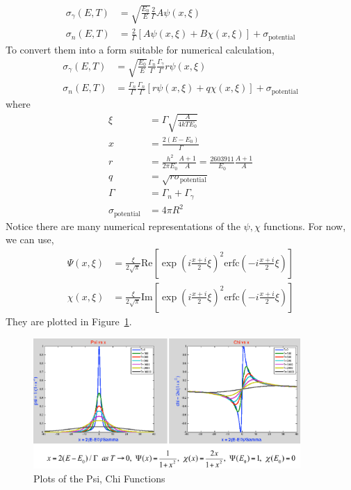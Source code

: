 \documentclass{school-22.211-notes}
\begin{document}
\begin{align}
\sigma_{\gamma} (E,T) &= \sqrt{\frac{E_0}{E}} \frac{2}{\Gamma} A \psi(x,\xi) \\
\sigma_{n} (E,T) &= \frac{2}{\Gamma} \left[ A \psi(x,\xi) + B \chi(x,\xi) \right] + \sigma_{\mathrm{potential}} 
\end{align}
To convert them into a form suitable for numerical calculation,
\begin{align}
\sigma_{\gamma} (E,T) &= \sqrt{\frac{E_0}{E}} \frac{\Gamma_n}{\Gamma} \frac{\Gamma_{\gamma}}{\Gamma} r \psi(x,\xi) \\
\sigma_{n} (E,T) &= \frac{\Gamma_n}{\Gamma} \frac{\Gamma_n}{\Gamma} \left[ r \psi(x,\xi) + q \chi(x,\xi) \right] + \sigma_{\mathrm{potential}} 
\end{align}
where
\begin{align}
\xi &= \Gamma \sqrt{\frac{A}{4 k T E_0}} \\
x &= \frac{2 (E-E_0)}{\Gamma} \\
r &= \frac{h^2}{2 \pi E_0} \frac{A+1}{A} = \frac{2603911}{E_0} \frac{A+1}{A} \\
q &= \sqrt{ r \sigma_{\mathrm{potential}} } \\
\Gamma &= \Gamma_n + \Gamma_{\gamma} \\
\sigma_{\mathrm{potential}} &=  4 \pi R^2 
\end{align}
Notice there are many numerical representations of the $\psi, \chi$ functions. For now, we can use,
\begin{align}
\Psi(x,\xi) &= \frac{\xi}{2 \sqrt{\pi}} \mathrm{Re}\left[ \exp{\left( i \frac{x+i}{2} \xi \right)^2} \mathrm{erfc}\left( -i \frac{x+i}{2} \xi \right) \right] \\
\chi(x,\xi) &= \frac{\xi}{2 \sqrt{\pi}} \mathrm{Im}\left[ \exp{\left( i \frac{x+i}{2} \xi \right)^2} \mathrm{erfc}\left( -i \frac{x+i}{2} \xi \right) \right] 
\end{align}
They are plotted in Figure~\ref{psi-chi-plot}. 
\begin{figure}
  \centering
  \includegraphics[width=4in]{images/r-m/psi-chi-plot.png}
  \caption{Plots of the Psi, Chi Functions} \label{psi-chi-plot} 
\end{figure}
\end{document}
